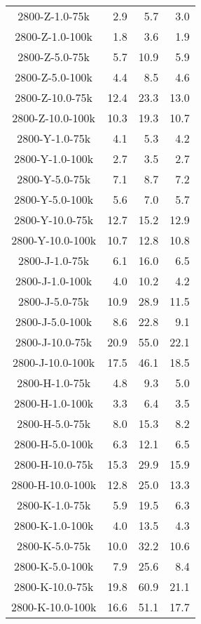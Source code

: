 \begin{longtable}{crrr}
    2800-Z-1.0-75k &   2.9 &    5.7 &   3.0 \\
    2800-Z-1.0-100k &   1.8 &    3.6 &   1.9 \\
    2800-Z-5.0-75k &   5.7 &   10.9 &   5.9 \\
    2800-Z-5.0-100k &   4.4 &    8.5 &   4.6 \\
    2800-Z-10.0-75k &  12.4 &   23.3 &  13.0 \\
    2800-Z-10.0-100k &  10.3 &   19.3 &  10.7 \\
    2800-Y-1.0-75k &   4.1 &    5.3 &   4.2 \\
    2800-Y-1.0-100k &   2.7 &    3.5 &   2.7 \\
    2800-Y-5.0-75k &   7.1 &    8.7 &   7.2 \\
    2800-Y-5.0-100k &   5.6 &    7.0 &   5.7 \\
    2800-Y-10.0-75k &  12.7 &   15.2 &  12.9 \\
    2800-Y-10.0-100k &  10.7 &   12.8 &  10.8 \\
    2800-J-1.0-75k &   6.1 &   16.0 &   6.5 \\
    2800-J-1.0-100k &   4.0 &   10.2 &   4.2 \\
    2800-J-5.0-75k &  10.9 &   28.9 &  11.5 \\
    2800-J-5.0-100k &   8.6 &   22.8 &   9.1 \\
    2800-J-10.0-75k &  20.9 &   55.0 &  22.1 \\
    2800-J-10.0-100k &  17.5 &   46.1 &  18.5 \\
    2800-H-1.0-75k &   4.8 &    9.3 &   5.0 \\
    2800-H-1.0-100k &   3.3 &    6.4 &   3.5 \\
    2800-H-5.0-75k &   8.0 &   15.3 &   8.2 \\
    2800-H-5.0-100k &   6.3 &   12.1 &   6.5 \\
    2800-H-10.0-75k &  15.3 &   29.9 &  15.9 \\
    2800-H-10.0-100k &  12.8 &   25.0 &  13.3 \\
    2800-K-1.0-75k &   5.9 &   19.5 &   6.3 \\
    2800-K-1.0-100k &   4.0 &   13.5 &   4.3 \\
    2800-K-5.0-75k &  10.0 &   32.2 &  10.6 \\
    2800-K-5.0-100k &   7.9 &   25.6 &   8.4 \\
    2800-K-10.0-75k &  19.8 &   60.9 &  21.1 \\
    2800-K-10.0-100k &  16.6 &   51.1 &  17.7 \\

\end{longtable}
